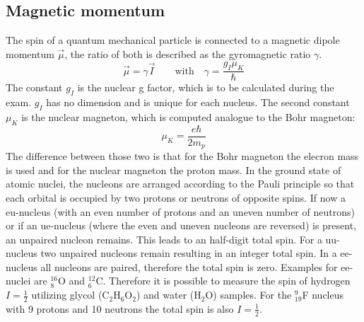 \subsection{Magnetic momentum}
The spin of a quantum mechanical particle is connected to a magnetic dipole momentum $\vec{\mu}$, the ratio of both is described as the gyromagnetic ratio $\gamma$.
$$\vec{\mu}=\gamma\vec{I}\qquad \textrm{with}\quad \gamma = \frac{g_I\mu_K}{\hbar}$$
The constant $g_I$ is the nuclear g factor, which is to be calculated during the exam. $g_I$ has no dimension and is unique for each nucleus. The second constant $\mu_K$ is the nuclear magneton, which is computed analogue to the Bohr magneton:
$$\mu_K = \frac{e\hbar}{2m_p}$$
The difference between those two is that for the Bohr magneton the elecron mass is used and for the nuclear magneton the proton mass. 
In the ground state of atomic nuclei, the nucleons are arranged according to the Pauli principle so that each orbital is occupied by two protons or neutrons of opposite spins. If now a eu-nucleus (with an even number of protons and an uneven number of neutrons) or if an ue-nucleus (where the even and uneven nucleons are reversed) is present, an unpaired nucleon remains. This leads to an half-digit total spin. For a uu-nucleus two unpaired nucleons remain resulting in an integer total spin. In a ee-nucleus all nucleons are paired, therefore the total spin is zero. Examples for ee-nuclei are $^{16}_{8}$O and $^{12}_6$C. Therefore it is possible to measure the spin of hydrogen $I=\frac{1}{2}$ utilizing glycol (C$_2$H$_6$O$_2$) and water (H$_2$O) samples. For the $^{9}_{19}$F nucleus with 9 protons and 10 neutrons the total spin is also $I=\frac{1}{2}$.
